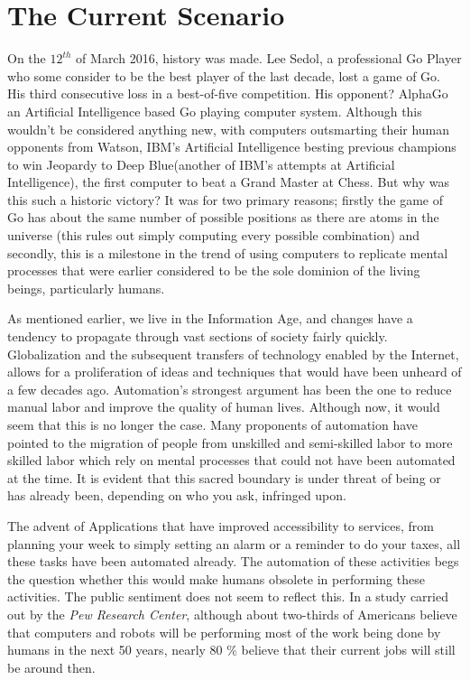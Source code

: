 \section{The Current Scenario}
\label{sec:-current}
On the $12^{th}$ of March 2016, history was made. Lee Sedol, a professional Go Player who some consider to be the best player of the last decade, lost a game of Go. His third consecutive loss in a best-of-five competition. His opponent? AlphaGo an Artificial Intelligence based Go playing computer system\cite{alphagolee}. Although this wouldn't be considered anything new, with computers outsmarting their human opponents from Watson, IBM's Artificial Intelligence besting previous champions to win Jeopardy\cite{watsonjeopardy} to Deep Blue(another of IBM's attempts at Artificial Intelligence), the first computer to beat a Grand Master at Chess. But why was this such a historic victory? It was for two primary reasons; firstly the game of Go has about the same number of possible positions as there are atoms in the universe (this rules out simply computing every possible combination) and secondly, this is a milestone in the trend of using computers to replicate mental processes that were earlier considered to be the sole dominion of the living beings, particularly humans.

As mentioned earlier, we live in the Information Age, and changes have a tendency to propagate through vast sections of society fairly quickly. Globalization and the subsequent transfers of technology enabled by the Internet, allows for a proliferation of ideas and techniques that would have been unheard of a few decades ago. Automation's strongest argument has been the one to reduce manual labor and improve the quality of human lives. Although now, it would seem that this is no longer the case. Many proponents of automation have pointed to the migration of people from unskilled and semi-skilled labor to more skilled labor which rely on mental processes that could not have been automated at the time. It is evident that this sacred boundary is under threat of being or has already been, depending on who you ask, infringed upon.

The advent of Applications that have improved accessibility to services, from planning your week to simply setting an alarm or a reminder to do your taxes, all these tasks have been automated already. The automation of these activities begs the question whether this would make humans obsolete in performing these activities. The public sentiment does not seem to reflect this. In a study carried out by the \textit{Pew Research Center}\cite{workforcepew}, although about two-thirds of Americans believe that computers and robots will be performing most of the work being done by humans in the next 50 years, nearly 80 \% believe that their current jobs will still be around then.
	
